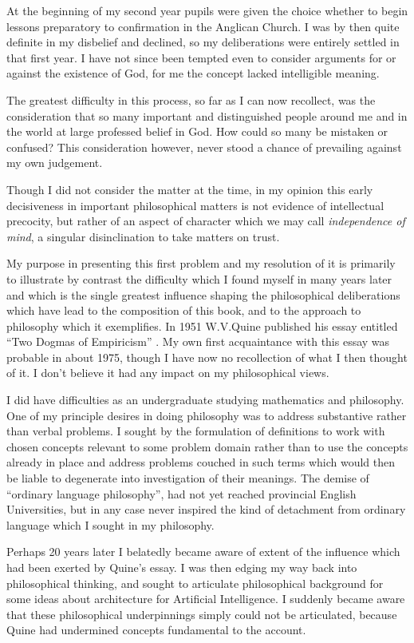 At the beginning of my second year pupils were given the choice whether to begin lessons preparatory to confirmation in the Anglican Church.
I was by then quite definite in my disbelief and declined, so my deliberations were entirely settled in that first year.
I have not since been tempted even to consider arguments for or against the existence of God, for me the concept lacked intelligible meaning.

The greatest difficulty in this process, so far as I can now recollect, was the consideration that so many important and distinguished people around me and in the world at large professed belief in God.
How could so many be mistaken or confused?
This consideration however, never stood a chance of prevailing against my own judgement.

Though I did not consider the matter at the time, in my opinion this early decisiveness in important philosophical matters is not evidence of intellectual precocity, but rather of an aspect of character which we may call {\it independence of mind}, a singular disinclination to take matters on trust.

My purpose in presenting this first problem and my resolution of it is primarily to illustrate by contrast the difficulty which I found myself in many years later and which is the single greatest influence shaping the philosophical deliberations which have lead to the composition of this book, and to the approach to philosophy which it exemplifies.
In 1951 W.V.Quine published his essay entitled ``Two Dogmas of Empiricism'' \cite{quine51}.
My own first acquaintance with this essay was probable in about 1975, though I have now no recollection of what I then thought of it.
I don't believe it had any impact on my philosophical views.

I did have difficulties as an undergraduate studying mathematics and philosophy.
One of my principle desires in doing philosophy was to address substantive rather than verbal problems.
I sought by the formulation of definitions to work with chosen concepts relevant to some problem domain rather than to use the concepts already in place and address problems couched in such terms which would then be liable to degenerate into investigation of their meanings.
The demise of ``ordinary language philosophy'', had not yet reached provincial English Universities, but in any case never inspired the kind of detachment from ordinary language which I sought in my philosophy.

Perhaps 20 years later I belatedly became aware of extent of the influence which had been exerted by Quine's essay.
I was then edging my way back into philosophical thinking, and sought to articulate philosophical background for some ideas about architecture for Artificial Intelligence.
I suddenly became aware that these philosophical underpinnings simply could not be articulated, because Quine had undermined concepts fundamental to the account.

